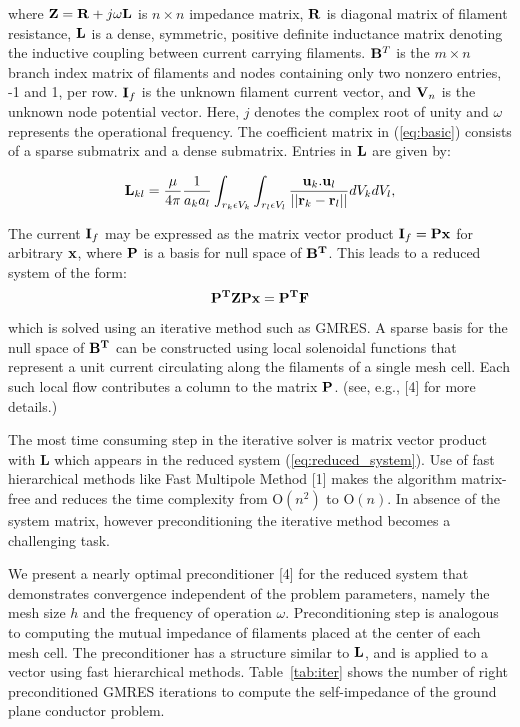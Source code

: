 \documentclass{report}
\begin{document}
where ${\bf Z} = {\bf R} + j\omega{\bf L}$ is $n \times n$ impedance
matrix, ${\bf R}$ is diagonal matrix of filament resistance, ${\bf L}$ is
a dense, symmetric, positive definite inductance matrix denoting the
inductive coupling between current carrying filaments. ${\bf B}^T$ is the
$m \times n$ branch index matrix of filaments and nodes containing only
two nonzero entries, -1 and 1, per row. ${\bf I}_f$ is the unknown
filament current vector, and ${\bf V}_n$ is the unknown node potential
vector. Here, $j$ denotes the complex root of unity and $\omega$
represents the operational frequency. The coefficient matrix in
(\ref{eq:basic}) consists of a sparse submatrix and a dense submatrix.
Entries in ${\bf L}$ are given by:

$$
{\bf L}_{kl}
=\frac{\mu}{4\pi}\frac{1}{a_{k}a_{l}}\int_{{r_k}\epsilon{V_k}}
\int_{{r_l}\epsilon{V_l}}\frac{{\bf u}_{k}{\bf .}{\bf u}_{l}}{||{\bf r}_{k}
- {\bf r}_{l} ||} dV_{k}dV_{l},
$$

The current ${\bf I}_f$ may be expressed as the matrix vector product
${\bf I}_f = {\bf Px}$ for arbitrary ${\bf x}$, where ${\bf P}$ is a
basis for null space of ${\bf B^T}$. This leads to a reduced system of
the form:
\begin{equation}
\label{eq:reduced_system}
{\bf P^TZPx} = {\bf P^TF}
\end{equation}

which is solved using an iterative method such as GMRES. A sparse basis
for the null space of ${\bf B^T}$ can be constructed using local
solenoidal functions that represent a unit current circulating along the
filaments of a single mesh cell. Each such local flow contributes a
column to the matrix ${\bf P}$. (see, e.g., [4] for more details.)

The most time consuming step in the iterative solver is matrix vector
product with {\bf L} which appears in the reduced system
(\ref{eq:reduced_system}). Use of fast hierarchical methods like Fast
Multipole Method [1] makes the algorithm matrix-free and reduces the time
complexity from O$(n^2)$ to O$(n)$. In absence of the system matrix,
however preconditioning the iterative method becomes a challenging task.

We present a nearly optimal preconditioner [4] for the reduced system
that demonstrates convergence independent of the problem parameters,
namely the mesh size $h$ and the frequency of operation $\omega$.
Preconditioning step is analogous to computing the mutual impedance of
filaments placed at the center of each mesh cell. The preconditioner has
a structure similar to ${\bf L}$, and is applied to a vector using fast
hierarchical methods. Table~\ref{tab:iter} shows the number of right
preconditioned GMRES iterations to compute the self-impedance of the
ground plane conductor problem.
\end{document}
